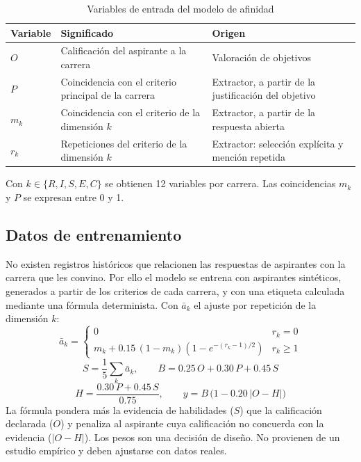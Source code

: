\begin{table}[H]
\centering
\small
\renewcommand{\arraystretch}{1.2}
\caption{Variables de entrada del modelo de afinidad}
\label{tab:features}
\begin{tabularx}{\textwidth}{L{0.14\textwidth}L{0.30\textwidth}X}
\toprule
{} \color{white}\textbf{Variable} & \color{white}\textbf{Significado} & \color{white}\textbf{Origen} \\
\midrule
$O$ & Calificación del aspirante a la carrera & Valoración de objetivos \\
$P$ & Coincidencia con el criterio principal de la carrera & Extractor, a partir de la justificación del objetivo \\
$m_k$ & Coincidencia con el criterio de la dimensión $k$ & Extractor, a partir de la respuesta abierta \\
$r_k$ & Repeticiones del criterio de la dimensión $k$ & Extractor: selección explícita y mención repetida \\
\bottomrule
\end{tabularx}
\end{table}

Con $k \in \{R, I, S, E, C\}$ se obtienen 12 variables por carrera. Las coincidencias $m_k$ y $P$ se expresan entre 0 y 1.

\subsection{Datos de entrenamiento}
No existen registros históricos que relacionen las respuestas de aspirantes con la carrera que les convino. Por ello el modelo se entrena con aspirantes sintéticos, generados a partir de los criterios de cada carrera, y con una etiqueta calculada mediante una fórmula determinista. Con $\bar{a}_k$ el ajuste por repetición de la dimensión $k$:
\begin{equation}
\bar{a}_k =
\begin{cases}
0 & r_k = 0 \\
m_k + 0.15\,(1-m_k)\left(1-e^{-(r_k-1)/2}\right) & r_k \ge 1
\end{cases}
\end{equation}
\begin{equation}
S = \frac{1}{5}\sum_{k}\bar{a}_k, \qquad
B = 0.25\,O + 0.30\,P + 0.45\,S
\end{equation}
\begin{equation}
H = \frac{0.30\,P + 0.45\,S}{0.75}, \qquad
y = B\,\bigl(1 - 0.20\,\lvert O - H\rvert\bigr)
\end{equation}
La fórmula pondera más la evidencia de habilidades ($S$) que la calificación declarada ($O$) y penaliza al aspirante cuya calificación no concuerda con la evidencia ($\lvert O - H\rvert$). Los pesos son una decisión de diseño. No provienen de un estudio empírico y deben ajustarse con datos reales.

